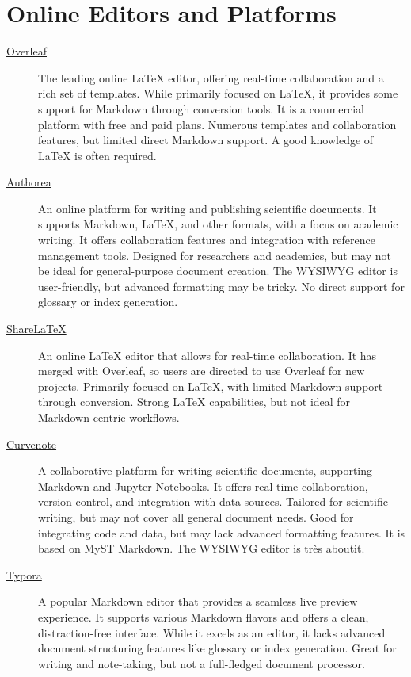 \documentclass[a4paper,twoside]{article}
\begin{document}
\section{Online Editors and Platforms}
\begin{description}
\item[{\href{https://www.overleaf.com/}{Overleaf}}] The leading online \LaTeX{} editor, offering real-time collaboration and a rich set of templates. While primarily focused on \LaTeX{}, it provides some support for Markdown through conversion tools. It is a commercial platform with free and paid plans. Numerous templates and collaboration features, but limited direct Markdown support. A good knowledge of \LaTeX{} is often required.
\item[{\href{https://www.authorea.com/}{Authorea}}] An online platform for writing and publishing scientific documents. It supports Markdown, \LaTeX{}, and other formats, with a focus on academic writing. It offers collaboration features and integration with reference management tools. Designed for researchers and academics, but may not be ideal for general-purpose document creation. The WYSIWYG editor is user-friendly, but advanced formatting may be tricky. No direct support for glossary or index generation.
\item[{\href{https://www.sharelatex.com/}{ShareLaTeX}}] An online \LaTeX{} editor that allows for real-time collaboration. It has merged with Overleaf, so users are directed to use Overleaf for new projects. Primarily focused on \LaTeX{}, with limited Markdown support through conversion. Strong \LaTeX{} capabilities, but not ideal for Markdown-centric workflows.
\item[{\href{https://curvenote.com/}{Curvenote}}] A collaborative platform for writing scientific documents, supporting Markdown and Jupyter Notebooks. It offers real-time collaboration, version control, and integration with data sources. Tailored for scientific writing, but may not cover all general document needs. Good for integrating code and data, but may lack advanced formatting features. It is based on MyST Markdown. The WYSIWYG editor is très aboutit.
\item[{\href{https://typora.io/}{Typora}}] A popular Markdown editor that provides a seamless live preview experience. It supports various Markdown flavors and offers a clean, distraction-free interface. While it excels as an editor, it lacks advanced document structuring features like glossary or index generation. Great for writing and note-taking, but not a full-fledged document processor.
\end{description}
\end{document}
